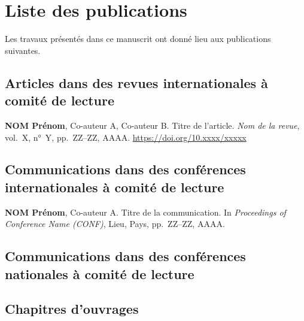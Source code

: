 
\chapter*{Liste des publications}

Les travaux présentés dans ce manuscrit ont donné lieu aux publications suivantes.

\section*{Articles dans des revues internationales à comité de lecture}

\begin{publist}
  \pubitem \textbf{NOM Prénom}, Co-auteur A, Co-auteur B.
    Titre de l'article.
    \textit{Nom de la revue}, vol.~X, n°~Y, pp.~ZZ--ZZ, AAAA.
    \url{https://doi.org/10.xxxx/xxxxx}

  \pubitem {}
\end{publist}

\section*{Communications dans des conférences internationales à comité de lecture}

\begin{publist}
  \pubitem \textbf{NOM Prénom}, Co-auteur A.
    Titre de la communication.
    In \textit{Proceedings of Conference Name (CONF)}, Lieu, Pays, pp.~ZZ--ZZ, AAAA.

  \pubitem {}
\end{publist}

\section*{Communications dans des conférences nationales à comité de lecture}

\begin{publist}
  \pubitem {}
\end{publist}

\section*{Chapitres d'ouvrages}

\begin{publist}
  \pubitem {}
\end{publist}
